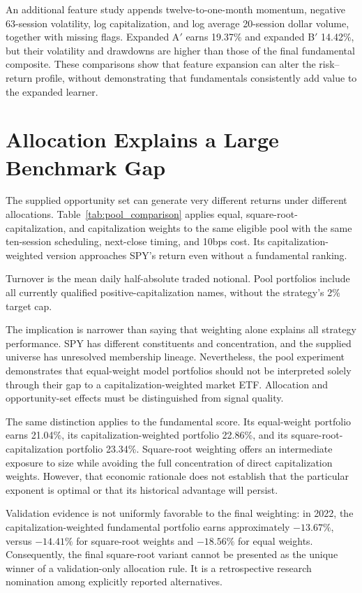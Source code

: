 \documentclass[11pt]{article}
\newcommand{\resulttable}[3]{\begin{table}[H]\centering\caption{#2}\label{tab:#1}\small\par\vspace{3pt}\begin{minipage}{\textwidth}\footnotesize #3\end{minipage}\end{table}}
\begin{document}
An additional feature study appends twelve-to-one-month momentum, negative 63-session volatility, log capitalization, and log average 20-session dollar volume, together with missing flags. Expanded A$'$ earns 19.37\% and expanded B$'$ 14.42\%, but their volatility and drawdowns are higher than those of the final fundamental composite. These comparisons show that feature expansion can alter the risk--return profile, without demonstrating that fundamentals consistently add value to the expanded learner.
\clearpage

\section{Allocation Explains a Large Benchmark Gap}
The supplied opportunity set can generate very different returns under different allocations. Table~\ref{tab:pool_comparison} applies equal, square-root-capitalization, and capitalization weights to the same eligible pool with the same ten-session scheduling, next-close timing, and 10bps cost. Its capitalization-weighted version approaches SPY's return even without a fundamental ranking.
\resulttable{pool_comparison}{Matched-universe allocation benchmarks, 2023--2025.}{Turnover is the mean daily half-absolute traded notional. Pool portfolios include all currently qualified positive-capitalization names, without the strategy's 2\% target cap.}

The implication is narrower than saying that weighting alone explains all strategy performance. SPY has different constituents and concentration, and the supplied universe has unresolved membership lineage. Nevertheless, the pool experiment demonstrates that equal-weight model portfolios should not be interpreted solely through their gap to a capitalization-weighted market ETF. Allocation and opportunity-set effects must be distinguished from signal quality.

The same distinction applies to the fundamental score. Its equal-weight portfolio earns 21.04\%, its capitalization-weighted portfolio 22.86\%, and its square-root-capitalization portfolio 23.34\%. Square-root weighting offers an intermediate exposure to size while avoiding the full concentration of direct capitalization weights. However, that economic rationale does not establish that the particular exponent is optimal or that its historical advantage will persist.

Validation evidence is not uniformly favorable to the final weighting: in 2022, the capitalization-weighted fundamental portfolio earns approximately $-13.67\%$, versus $-14.41\%$ for square-root weights and $-18.56\%$ for equal weights. Consequently, the final square-root variant cannot be presented as the unique winner of a validation-only allocation rule. It is a retrospective research nomination among explicitly reported alternatives.
\end{document}

